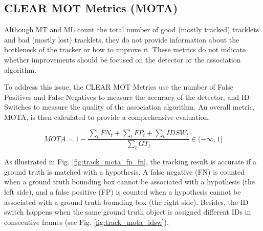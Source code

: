 \subsection{CLEAR MOT Metrics (MOTA)}

Although MT and ML count the total number of good (mostly tracked) tracklets and bad (mostly lost) tracklets, they do not provide information about the bottleneck of the tracker or how to improve it. These metrics do not indicate whether improvements should be focused on the detector or the association algorithm.

To address this issue, the CLEAR MOT Metrics use the number of False Positives and False Negatives to measure the accuracy of the detector, and ID Switches to measure the quality of the association algorithm. An overall metric, MOTA, is then calculated to provide a comprehensive evaluation.

\begin{equation}
    MOTA = 1 - \frac{ \sum_t FN_t + \sum_t FP_t + \sum_t IDSW_t}{\sum_t GT_t} \in (-\infty, 1] 
\end{equation}

As illustrated in Fig. \ref{fig:track_mota_fp_fn}, the tracking result is accurate if a ground truth is matched with a hypothesis. A false negative (FN) is counted when a ground truth bounding box cannot be associated with a hypothesis (the left side), and a false positive (FP) is counted when a hypothesis cannot be associated with a ground truth bounding box (the right side). Besides, the ID switch happens when the same ground truth object is assigned different IDs in consecutive frames (see Fig. \ref{fig:track_mota_idsw}).

